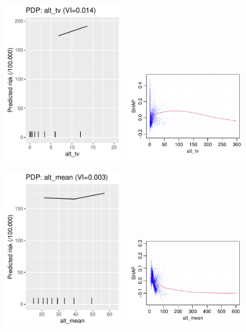 \documentclass[12pt]{article}
\begin{document}
\begin{figure}[h]
\centering
\includegraphics[width=0.45\textwidth]{figures/pdp/alt_tv.pdf}
\includegraphics[width=0.45\textwidth]{figures/shap/alt_tv.pdf}
\end{figure}
\begin{figure}[h]
\centering
\includegraphics[width=0.45\textwidth]{figures/pdp/alt_mean.pdf}
\includegraphics[width=0.45\textwidth]{figures/shap/alt_mean.pdf}
\end{figure}
\end{document}
